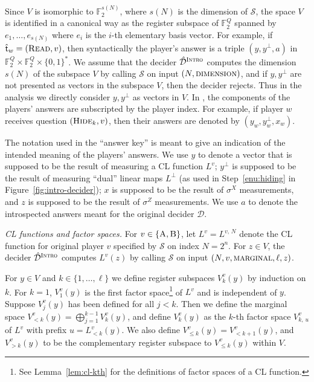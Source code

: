 \documentclass[11pt]{article}
\theoremstyle{definition}
\newcommand{\F}{\ensuremath{\mathbb{F}}}
\newcommand{\sampler}{\mathcal{S}}
\newcommand{\decider}{\mathcal{D}}
\newcommand{\gamestyle}[1]{\ensuremath{\textsc{#1}}\xspace}
\newcommand{\intro}{\gamestyle{Intro}}
\newcommand{\labelstyle}[1]{\ensuremath{\textsc{#1}}\xspace}
\newcommand{\tvarstyle}[1]{\mathsf{#1}}
\newcommand{\tvar}{\ensuremath{\tvarstyle{t}}}
\newcommand{\trole}{\ensuremath{v}}
\newcommand{\alice}{\labelstyle{A}}
\newcommand{\bob}{\labelstyle{B}}
\newcommand{\typestyle}[1]{\ensuremath{\textsc{#1}}\xspace}
\newcommand{\Read}{\typestyle{Read}}
\newcommand{\Hide}[1]{\typestyle{Hide}_{#1}}
\newcommand{\AB}{\{\alice, \bob\}}
\begin{document}
Since $V$ is isomorphic to $\F_2^{s(N)}$, where $s(N)$ is the dimension of
$\sampler$, the space $V$ is identified in a canonical way as the register
subspace of $\F_2^Q$ spanned by $e_1,\ldots,e_{s(N)}$ where $e_i$ is the $i$-th
elementary basis vector.
For example, if $\hat{\tvar}_w = (\Read,\trole)$, then syntactically the
player's answer is a triple $(y,y^\perp,a)$ in $\F_2^Q \times \F_2^Q
\times \{0,1\}^*$.
We assume that the decider $\hat{\decider}^\intro$ computes the dimension $s(N)$ of the
subspace $V$ by calling $\sampler$ on input $(N,\gamestyle{dimension})$, and
 if $y,y^\perp$ are not presented as vectors in the subspace $V$,
then the decider rejects. Thus in the analysis we directly consider $y,y^\perp$ as vectors in $V$.
In , the components of the players' answers are
subscripted by the player index.
For example, if player $w$ receives question $(\Hide{k},\trole)$, then their
answers are denoted by $(y_w,y_w^\perp,x_w)$.

The notation used in the ``answer key'' is meant to give an indication of the
intended meaning of the players' answers.
We use $y$ to denote a vector that is supposed to be the result of measuring a
CL function $L^\trole$; $y^\perp$ is supposed to be the result of measuring
``dual'' linear maps $L^\perp$ (as used in Step~\ref{enu:hiding} in
Figure~\ref{fig:intro-decider}); $x$ is supposed to be the result of $\sigma^X$
measurements, and $z$ is supposed to be the result of $\sigma^Z$ measurements.
We use $a$ to denote the introspected answers meant for the original decider
$\decider$.

\medskip
\emph{CL functions and factor spaces.}
For $\trole \in \AB$, let $L^\trole = L^{\trole,\, N}$ denote the CL function
for original player $\trole$ specified by $\sampler$ on index $N = 2^n$.
For $z \in V$, the decider $\hat{\decider}^\intro$ computes $L^\trole(z)$ by calling
$\sampler$ on input $(N, \trole, \gamestyle{marginal}, \ell, z)$.

For $y \in V$ and $k \in \{1,\ldots,\ell\}$ we define register subspaces
$V_{k}^\trole (y)$ by induction on $k$.
For $k=1$, $V_1^\trole(y)$ is the first factor space\footnote{See
  Lemma~\ref{lem:cl-kth} for the definitions of factor spaces of a CL function.}
of $L^\trole$ and is independent of $y$.
Suppose $V_j^\trole(y)$ has been defined for all $j < k$.
Then we define the marginal space $V_{< k}^\trole(y) = \bigoplus_{j=1}^{k-1}
V_k^\trole(y)$, and define $V_k^\trole(y)$ as the $k$-th factor space $V_{k,\,
  u}^\trole$ of $L^\trole$ with prefix $u = L_{<k}^\trole(y)$.
We also define $V^\trole_{\leq k}(y) = V^\trole_{< k+1}(y)$, and $V^\trole_{>
  k}(y)$ to be the complementary register subspace to $V^\trole_{\leq k}(y)$
within $V$.
\end{document}
